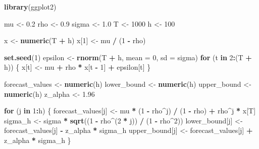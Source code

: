 \documentclass[
]{article}
\newenvironment{Shaded}{\begin{snugshade}}{\end{snugshade}}
\newcommand{\AttributeTok}[1]{\textcolor[rgb]{0.13,0.29,0.53}{#1}}
\newcommand{\ControlFlowTok}[1]{\textcolor[rgb]{0.13,0.29,0.53}{\textbf{#1}}}
\newcommand{\DecValTok}[1]{\textcolor[rgb]{0.00,0.00,0.81}{#1}}
\newcommand{\FloatTok}[1]{\textcolor[rgb]{0.00,0.00,0.81}{#1}}
\newcommand{\FunctionTok}[1]{\textcolor[rgb]{0.13,0.29,0.53}{\textbf{#1}}}
\newcommand{\NormalTok}[1]{#1}
\newcommand{\OtherTok}[1]{\textcolor[rgb]{0.56,0.35,0.01}{#1}}
\newcommand{\SpecialCharTok}[1]{\textcolor[rgb]{0.81,0.36,0.00}{\textbf{#1}}}
\begin{document}
\begin{Shaded}
\begin{Highlighting}[]
\FunctionTok{library}\NormalTok{(ggplot2)}

\NormalTok{mu }\OtherTok{\textless{}{-}} \FloatTok{0.2}
\NormalTok{rho }\OtherTok{\textless{}{-}} \FloatTok{0.9}
\NormalTok{sigma }\OtherTok{\textless{}{-}} \FloatTok{1.0}
\NormalTok{T }\OtherTok{\textless{}{-}} \DecValTok{1000}
\NormalTok{h }\OtherTok{\textless{}{-}} \DecValTok{100}

\NormalTok{x }\OtherTok{\textless{}{-}} \FunctionTok{numeric}\NormalTok{(T }\SpecialCharTok{+}\NormalTok{ h)}
\NormalTok{x[}\DecValTok{1}\NormalTok{] }\OtherTok{\textless{}{-}}\NormalTok{ mu }\SpecialCharTok{/}\NormalTok{ (}\DecValTok{1} \SpecialCharTok{{-}}\NormalTok{ rho)}

\FunctionTok{set.seed}\NormalTok{(}\DecValTok{1}\NormalTok{)}
\NormalTok{epsilon }\OtherTok{\textless{}{-}} \FunctionTok{rnorm}\NormalTok{(T }\SpecialCharTok{+}\NormalTok{ h, }\AttributeTok{mean =} \DecValTok{0}\NormalTok{, }\AttributeTok{sd =}\NormalTok{ sigma)}
\ControlFlowTok{for}\NormalTok{ (t }\ControlFlowTok{in} \DecValTok{2}\SpecialCharTok{:}\NormalTok{(T }\SpecialCharTok{+}\NormalTok{ h)) \{}
\NormalTok{  x[t] }\OtherTok{\textless{}{-}}\NormalTok{ mu }\SpecialCharTok{+}\NormalTok{ rho }\SpecialCharTok{*}\NormalTok{ x[t }\SpecialCharTok{{-}} \DecValTok{1}\NormalTok{] }\SpecialCharTok{+}\NormalTok{ epsilon[t]}
\NormalTok{\}}

\NormalTok{forecast\_values }\OtherTok{\textless{}{-}} \FunctionTok{numeric}\NormalTok{(h)}
\NormalTok{lower\_bound }\OtherTok{\textless{}{-}} \FunctionTok{numeric}\NormalTok{(h)}
\NormalTok{upper\_bound }\OtherTok{\textless{}{-}} \FunctionTok{numeric}\NormalTok{(h)}
\NormalTok{z\_alpha }\OtherTok{\textless{}{-}} \FloatTok{1.96}

\ControlFlowTok{for}\NormalTok{ (j }\ControlFlowTok{in} \DecValTok{1}\SpecialCharTok{:}\NormalTok{h) \{}
\NormalTok{  forecast\_values[j] }\OtherTok{\textless{}{-}}\NormalTok{ mu }\SpecialCharTok{*}\NormalTok{ (}\DecValTok{1} \SpecialCharTok{{-}}\NormalTok{ rho}\SpecialCharTok{\^{}}\NormalTok{j) }\SpecialCharTok{/}\NormalTok{ (}\DecValTok{1} \SpecialCharTok{{-}}\NormalTok{ rho) }\SpecialCharTok{+}\NormalTok{ rho}\SpecialCharTok{\^{}}\NormalTok{j }\SpecialCharTok{*}\NormalTok{ x[T]}
\NormalTok{  sigma\_h }\OtherTok{\textless{}{-}}\NormalTok{ sigma }\SpecialCharTok{*} \FunctionTok{sqrt}\NormalTok{((}\DecValTok{1} \SpecialCharTok{{-}}\NormalTok{ rho}\SpecialCharTok{\^{}}\NormalTok{(}\DecValTok{2} \SpecialCharTok{*}\NormalTok{ j)) }\SpecialCharTok{/}\NormalTok{ (}\DecValTok{1} \SpecialCharTok{{-}}\NormalTok{ rho}\SpecialCharTok{\^{}}\DecValTok{2}\NormalTok{))}
\NormalTok{  lower\_bound[j] }\OtherTok{\textless{}{-}}\NormalTok{ forecast\_values[j] }\SpecialCharTok{{-}}\NormalTok{ z\_alpha }\SpecialCharTok{*}\NormalTok{ sigma\_h}
\NormalTok{  upper\_bound[j] }\OtherTok{\textless{}{-}}\NormalTok{ forecast\_values[j] }\SpecialCharTok{+}\NormalTok{ z\_alpha }\SpecialCharTok{*}\NormalTok{ sigma\_h}
\NormalTok{\}}


\end{Highlighting}
\end{Shaded}
\end{document}
